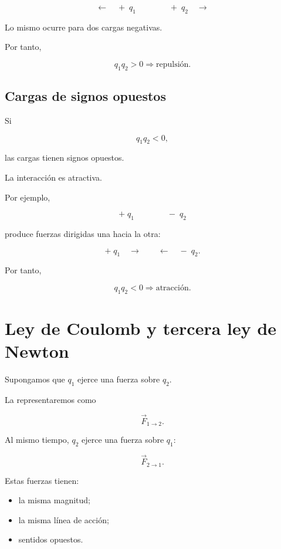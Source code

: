 \[
\longleftarrow
\quad
+\;q_1
\qquad\qquad
+\;q_2
\quad
\longrightarrow
\]

Lo mismo ocurre para dos cargas negativas.

Por tanto,

\[
\boxed{
q_1q_2>0
\Longrightarrow
\text{repulsión}
}.
\]



\subsection{Cargas de signos opuestos}

Si

\[
q_1q_2<0,
\]

las cargas tienen signos opuestos.

La interacción es atractiva.

Por ejemplo,

\[
+\;q_1
\qquad\qquad
-\;q_2
\]

produce fuerzas dirigidas una hacia la otra:

\[
+\;q_1
\quad
\longrightarrow
\qquad
\longleftarrow
\quad
-\;q_2.
\]

Por tanto,

\[
\boxed{
q_1q_2<0
\Longrightarrow
\text{atracción}
}.
\]



\section{Ley de Coulomb y tercera ley de Newton}

Supongamos que \(q_1\) ejerce una fuerza sobre \(q_2\).

La representaremos como

\[
\vec{F}_{1\to2}.
\]

Al mismo tiempo, \(q_2\) ejerce una fuerza sobre \(q_1\):

\[
\vec{F}_{2\to1}.
\]

Estas fuerzas tienen:

\begin{itemize}
    \item la misma magnitud;
    \item la misma línea de acción;
    \item sentidos opuestos.
\end{itemize}

